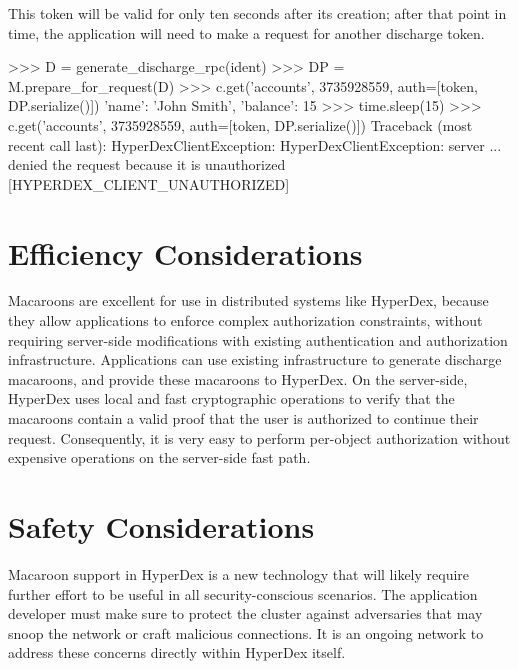 This token will be valid for only ten seconds after its creation; after that
point in time, the application will need to make a request for another discharge
token.

\begin{pythoncode}
>>> D = generate_discharge_rpc(ident)
>>> DP = M.prepare_for_request(D)
>>> c.get('accounts', 3735928559, auth=[token, DP.serialize()])
{'name': 'John Smith', 'balance': 15}
>>> time.sleep(15)
>>> c.get('accounts', 3735928559, auth=[token, DP.serialize()])
Traceback (most recent call last):
HyperDexClientException: HyperDexClientException: server ... denied the request because it is unauthorized [HYPERDEX_CLIENT_UNAUTHORIZED]
\end{pythoncode}

\section{Efficiency Considerations}

Macaroons are excellent for use in distributed systems like HyperDex, because
they allow applications to enforce complex authorization constraints, without
requiring server-side modifications with existing authentication and
authorization infrastructure.  Applications can use existing infrastructure to
generate discharge macaroons, and provide these macaroons to HyperDex.  On the
server-side, HyperDex uses local and fast cryptographic operations to verify
that the macaroons contain a valid proof that the user is authorized to continue
their request.  Consequently, it is very easy to perform per-object
authorization without expensive operations on the server-side fast path.

\section{Safety Considerations}

Macaroon support in HyperDex is a new technology that will likely require
further effort to be useful in all security-conscious scenarios.  The
application developer must make sure to protect the cluster against adversaries
that may snoop the network or craft malicious connections.  It is an ongoing
network to address these concerns directly within HyperDex itself.
